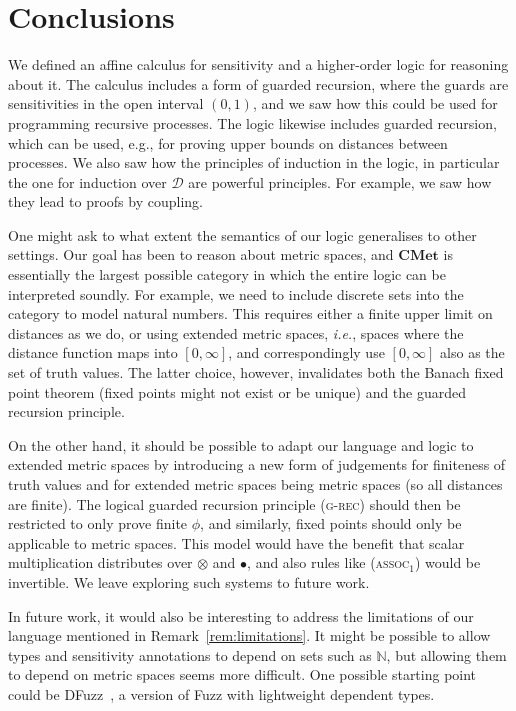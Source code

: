 \documentclass[a4paper,UKenglish,cleveref, autoref, thm-restate]{lipics-v2021}
\newcommand{\ie}{\textit{i.e.}}
\newcommand{\cat}[1]{\mathbf{#1}}
\newcommand{\CMet}{\cat{CMet}}
\newcommand{\mprod}{\otimes}
\newcommand{\nat}{\mathbb{N}}
\newcommand{\ltensor}{*}
\renewcommand{\ltensor}{\bullet}
\newcommand{\TD}{\mathcal{D}}
\begin{document}
\section{Conclusions} %
\label{sec:conclusions}

We defined an affine calculus for sensitivity and a higher-order logic for reasoning about it. The calculus includes
a form of guarded recursion, where the guards are sensitivities in the open interval $(0,1)$, and we saw how
this could be used for programming recursive processes. The logic likewise includes guarded recursion, 
which can be used, e.g., for proving upper bounds on distances between processes. We also saw how the 
principles of induction in the logic, in particular the one for induction over $\TD$ are powerful
principles. For example, we saw how they lead to proofs by coupling. 

One might ask to what extent the semantics of our logic generalises to other settings. Our goal has been
to reason about metric spaces, and $\CMet$ is essentially the largest possible category in which the entire
logic can be interpreted soundly. For example, we need to include discrete sets into the category to 
model natural numbers. This requires either a finite upper limit on distances as we do, 
or using extended metric spaces, \ie, spaces where the distance function maps into $[0, \infty]$,
and correspondingly use $[0, \infty]$ also as the set of truth values.
The latter choice, however, invalidates both the Banach fixed point theorem (fixed points might not exist or be unique) and the
guarded recursion principle. 

On the other hand, it should be possible to adapt our language and logic to extended metric spaces by introducing 
a new form of judgements for finiteness of truth values and for extended metric spaces being metric spaces (so all distances are finite). 
The logical guarded recursion
principle (\textsc{g-rec}) should then be restricted to only prove finite $\phi$, and similarly, fixed points should
only be applicable to metric spaces. This model would have the benefit that scalar multiplication
distributes over $\mprod$ and $\ltensor$, and also rules like (\textsc{assoc${}_1$}) would be invertible. 
We leave exploring such systems to future work. 

In future work, it would also be interesting to address the limitations of our language mentioned in Remark~\ref{rem:limitations}. 
It might be possible to allow types and sensitivity annotations to depend on sets such
as $\nat$, but allowing them to depend on metric spaces seems more difficult. One possible starting point could be 
DFuzz~\cite{GaboardiHHNP13}, a version of Fuzz with lightweight dependent types. 
\end{document}

